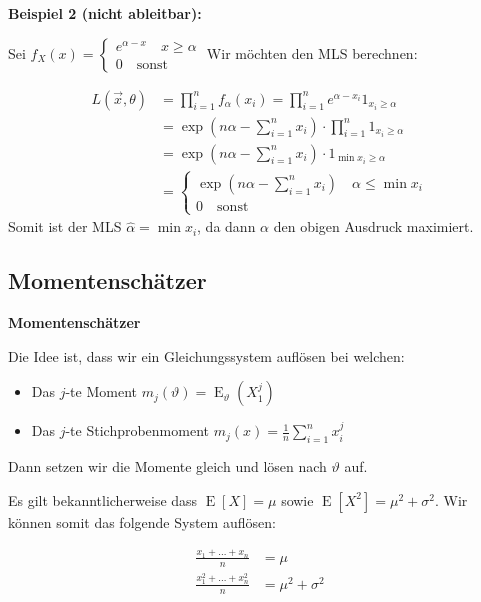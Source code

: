 \documentclass[25pt]{sciposter}
\newcommand{\E}{\operatorname{E}}
\renewcommand{\hat}{\widehat}
\newenvironment{method}[1]{\begin{mdframed}[backgroundcolor=blue!10,innertopmargin=15pt, innerbottommargin=15pt,nobreak=true]
		\textbf{#1 }
	}
	{ 
	\end{mdframed}
}
\begin{document}
\begin{multicols}{3}
\textbf{Beispiel 2 (nicht ableitbar):}

Sei $f_X(x) = \begin{cases}
e^{\alpha - x} \quad x \geq \alpha\\
0 \quad \text{sonst}
\end{cases}$ Wir möchten den MLS berechnen:

\begin{align*}
	L(\vec{x},\theta) &= \prod_{i=1}^{n} f_\alpha (x_i) = \prod_{i=1}^{n} e^{\alpha - x_i} 1_{x_i \geq \alpha}\\
	&= \exp \left(n\alpha - \sum_{i=1}^{n} x_i \right) \cdot \prod_{i=1}^{n} 1_{x_i\geq \alpha}\\
	&= \exp \left(n\alpha - \sum_{i=1}^{n} x_i \right) \cdot 1_{\min x_i \geq \alpha}\\
	&= \begin{cases}
	\exp (n \alpha - \sum_{i=1}^{n} x_i) \quad \alpha \leq \min x_i\\
	0 \quad \text{sonst}
	\end{cases}
\end{align*}
Somit ist der MLS $\hat{\alpha} = \min x_i$, da dann $\alpha$ den obigen Ausdruck maximiert.

\subsection*{Momentenschätzer}

\begin{method}{Momentenschätzer}
	
	Die Idee ist, dass wir ein Gleichungssystem auflösen bei welchen:
	\begin{itemize}
\item Das $j$-te Moment ${\displaystyle m_{j}(\vartheta )=\operatorname {E} _{\vartheta }(X_{1}^{j})}$
\item Das $j$-te Stichprobenmoment ${\displaystyle m_{j}(x)={\frac {1}{n}}\sum _{i=1}^{n}x_{i}^{j}}$
	\end{itemize}
	
	Dann setzen wir die Momente gleich und lösen nach $\vartheta$ auf.
	
\end{method}

Es gilt bekanntlicherweise dass $\E[X] = \mu$ sowie $\E[X^2] = \mu^2 + \sigma^2$. Wir können somit das folgende System auflösen:

\begin{align*}
	\frac{x_1 + \ldots + x_n}{n} &= \mu\\
	\frac{x_1^2 + \ldots + x_n^2}{n} &= \mu^2 + \sigma ^2
\end{align*}




\end{multicols}
\end{document}
